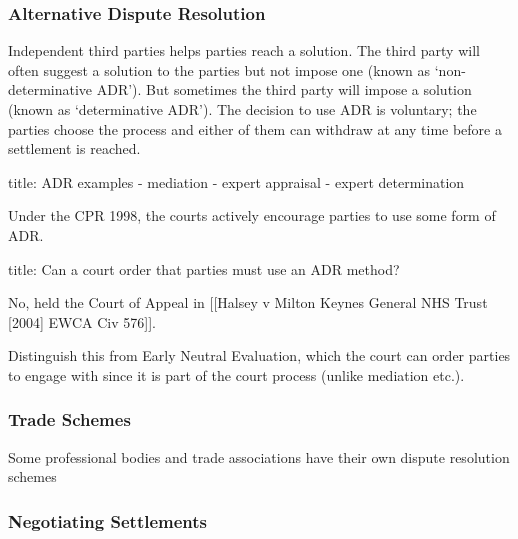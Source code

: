 \documentclass[
]{article}
\newenvironment{Shaded}{}{}
\newcommand{\NormalTok}[1]{#1}
\begin{document}
\hypertarget{alternative-dispute-resolution}{%
\subsubsection{Alternative Dispute
Resolution}\label{alternative-dispute-resolution}}

Independent third parties helps parties reach a solution. The third
party will often suggest a solution to the parties but not impose one
(known as `non-determinative ADR'). But sometimes the third party will
impose a solution (known as `determinative ADR'). The decision to use
ADR is voluntary; the parties choose the process and either of them can
withdraw at any time before a settlement is reached.

\begin{Shaded}
\begin{Highlighting}[]
\NormalTok{title: ADR examples}
\NormalTok{{-} mediation}
\NormalTok{{-} expert appraisal}
\NormalTok{{-} expert determination}
\end{Highlighting}
\end{Shaded}

Under the CPR 1998, the courts actively encourage parties to use some
form of ADR.

\begin{Shaded}
\begin{Highlighting}[]
\NormalTok{title: Can a court order that parties must use an ADR method?}

\NormalTok{No, held the Court of Appeal in [[Halsey v Milton Keynes General NHS Trust [2004] EWCA Civ 576]]. }
\end{Highlighting}
\end{Shaded}

Distinguish this from Early Neutral Evaluation, which the court can
order parties to engage with since it is part of the court process
(unlike mediation etc.).

\hypertarget{trade-schemes}{%
\subsubsection{Trade Schemes}\label{trade-schemes}}

Some professional bodies and trade associations have their own dispute
resolution schemes

\hypertarget{negotiating-settlements}{%
\subsubsection{Negotiating Settlements}\label{negotiating-settlements}}
\end{document}
